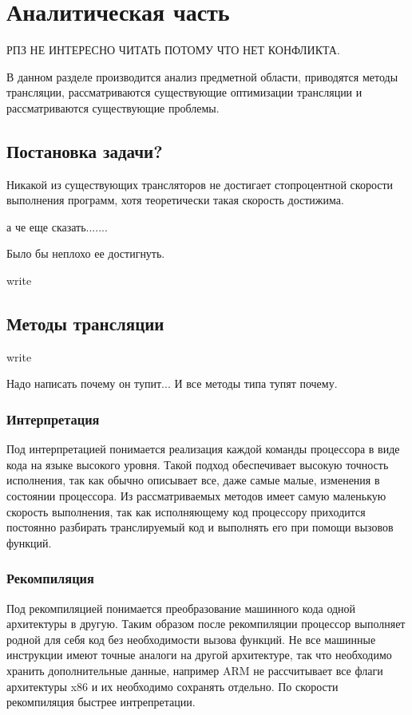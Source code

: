 \section{Аналитическая часть}
 
РПЗ НЕ ИНТЕРЕСНО ЧИТАТЬ ПОТОМУ ЧТО НЕТ КОНФЛИКТА.
 
В данном разделе производится анализ предметной области, приводятся методы трансляции, рассматриваются существующие оптимизации трансляции и рассматриваются существующие проблемы.
 
\subsection{Постановка задачи?}
 
Никакой из существующих трансляторов не достигает стопроцентной скорости выполнения программ, хотя теоретически такая скорость достижима.
 
а че еще сказать.......

Было бы неплохо ее достигнуть.

write

\subsection{Методы трансляции}

write

Надо написать почему он тупит... И все методы типа тупят почему.

\subsubsection{Интерпретация}

Под интерпретацией понимается реализация каждой команды процессора в виде кода на языке высокого уровня. Такой подход обеспечивает высокую точность исполнения, так как обычно описывает все, даже самые малые, изменения в состоянии процессора. Из рассматриваемых методов имеет самую маленькую скорость выполнения, так как исполняющему код процессору приходится постоянно разбирать транслируемый код и выполнять его при помощи вызовов функций.

\subsubsection{Рекомпиляция}

Под рекомпиляцией понимается преобразование машинного кода одной архитектуры в другую. Таким образом после рекомпиляции процессор выполняет родной для себя код без необходимости вызова функций. Не все машинные инструкции имеют точные аналоги на другой архитектуре, так что необходимо хранить дополнительные данные, например ARM не рассчитывает все флаги архитектуры x86 и их необходимо сохранять отдельно. По скорости рекомпиляция быстрее интрепретации.

